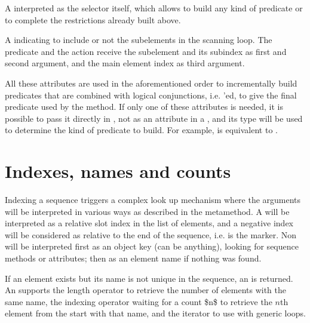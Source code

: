 \documentclass[letterpaper,10pt,english]{sphinxmanual}
\begin{document}
\begin{description}
\sphinxAtStartPar
A  interpreted as the selector itself, which allows to build any kind of predicate or to complete the restrictions already built above.

\sphinxAtStartPar
A  indicating to include or not the sub\sphinxhyphen{}elements in the scanning loop. The predicate and the action receive the sub\sphinxhyphen{}element and its sub\sphinxhyphen{}index as
first and second argument, and the main element index as third argument.

\end{description}

\sphinxAtStartPar
All these attributes are used in the aforementioned order to incrementally build predicates that are combined with logical conjunctions, i.e. ’ed,
to give the final predicate used by the  method. If only one of these attributes is needed, it is possible to pass it directly in ,
not as an attribute in a , and its type will be used to determine the kind of predicate to build. For example,  is equivalent
to .


\section{Indexes, names and counts}
\label{\detokenize{sequences:indexes-names-and-counts}}
\sphinxAtStartPar
Indexing a sequence triggers a complex look up mechanism where the arguments will be interpreted in various ways as described in the  metamethod.
A  will be interpreted as a relative slot index in the list of elements, and a negative index will be considered as relative to the end of the sequence,
i.e.  is the  marker. Non\sphinxhyphen{}  will be interpreted first as an object key (can be anything), looking for sequence methods or attributes;
then as an element name if nothing was found.

\sphinxAtStartPar
If an element exists but its name is not unique in the sequence, an  is returned. An  supports the length \sphinxcode{\sphinxupquote{\#}} operator to retrieve the
number of elements with the same name, the indexing operator \sphinxcode{\sphinxupquote{{[}{]}}} waiting for a count \$n\$ to retrieve the \(n\)\sphinxhyphen{}th element from the start with that name,
and the iterator  to use with generic  loops.
\end{document}
